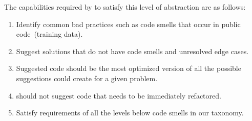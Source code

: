 The capabilities required by \cct{} to satisfy this level of abstraction are as follows:
\begin{enumerate}
    \item Identify common bad practices such as code smells that occur in public code~(training data).
    \item Suggest solutions that do not have code smells and unresolved edge cases.
    \item Suggested code should be the most optimized version of all the possible suggestions \cct{} could create for a given problem.
    \item \cct{} should not suggest code that needs to be immediately refactored.
    \item Satisfy requirements of all the levels below code smells in our taxonomy.
\end{enumerate}


